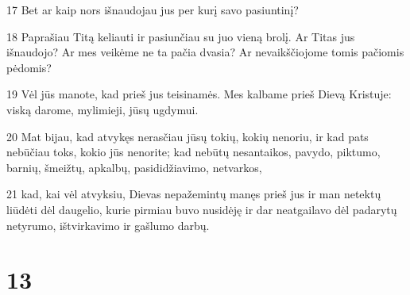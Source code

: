 \par 17 Bet ar kaip nors išnaudojau jus per kurį savo pasiuntinį? 
\par 18 Paprašiau Titą keliauti ir pasiunčiau su juo vieną brolį. Ar Titas jus išnaudojo? Ar mes veikėme ne ta pačia dvasia? Ar nevaikščiojome tomis pačiomis pėdomis? 
\par 19 Vėl jūs manote, kad prieš jus teisinamės. Mes kalbame prieš Dievą Kristuje: viską darome, mylimieji, jūsų ugdymui. 
\par 20 Mat bijau, kad atvykęs nerasčiau jūsų tokių, kokių nenoriu, ir kad pats nebūčiau toks, kokio jūs nenorite; kad nebūtų nesantaikos, pavydo, piktumo, barnių, šmeižtų, apkalbų, pasididžiavimo, netvarkos, 
\par 21 kad, kai vėl atvyksiu, Dievas nepažemintų manęs prieš jus ir man netektų liūdėti dėl daugelio, kurie pirmiau buvo nusidėję ir dar neatgailavo dėl padarytų netyrumo, ištvirkavimo ir gašlumo darbų.


\chapter{13}


